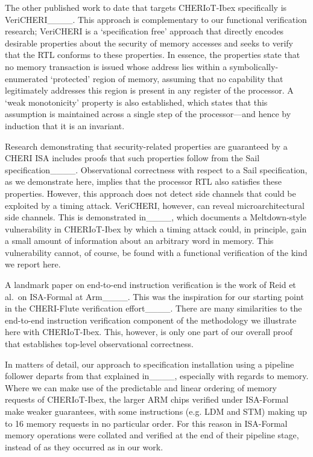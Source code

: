 \medskip

The other published work to date that targets CHERIoT-Ibex specifically is
VeriCHERI____.  This approach is complementary to our
functional verification research; VeriCHERI is a `specification free'
approach that directly encodes desirable properties about the security of
memory accesses and seeks to verify that the RTL conforms to these
properties. In essence, the properties state that no memory transaction is
issued whose address lies within a symbolically-enumerated `protected'
region of memory, assuming that no capability that legitimately addresses
this region is present in any register of the processor. A `weak
monotonicity' property is also established, which states that this
assumption is maintained across a single step of the processor---and hence
by induction that it is an invariant.

Research demonstrating that security-related properties are guaranteed by a
CHERI ISA includes proofs that such properties follow from the Sail
specification____.  Observational correctness
with respect to a Sail specification, as we demonstrate here, implies that
the processor RTL also satisfies these properties.
However, this approach does not detect side channels that could be
exploited by a timing attack. VeriCHERI, however, can reveal
microarchitectural side channels. This is demonstrated
in____, which documents a Meltdown-style vulnerability in
CHERIoT-Ibex by which a timing attack could, in principle, gain a small
amount of information about an arbitrary word in memory. This vulnerability
cannot, of course, be found with a functional verification of the kind we
report here.

\medskip

A landmark paper on end-to-end instruction verification is the work of Reid
et al.~on ISA-Formal at Arm____. This was the inspiration
for our starting point in the CHERI-Flute verification
effort____.  There are many similarities to the
end-to-end instruction verification component of the methodology we
illustrate here with CHERIoT-Ibex.  This, however, is only one part of our
overall proof that establishes top-level observational correctness.

In matters of detail, our approach to specification installation using a
pipeline follower departs from that explained
in____, especially with regards to memory. Where we
can make use of the predictable and linear ordering of memory requests
of CHERIoT-Ibex, the larger ARM chips verified under ISA-Formal make weaker
guarantees, with some instructions (e.g. LDM and STM) making up to 16 memory requests in
no particular order. For this reason in ISA-Formal memory operations were
collated and verified at the end of their pipeline stage, instead of as they
occurred as in our work.

